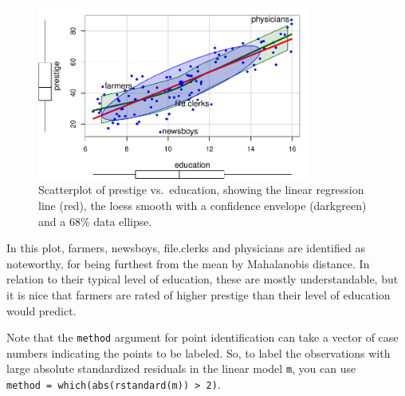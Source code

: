 \documentclass[
  letterpaper,
  10pt,
  krantz2]{krantz}
\begin{document}
\begin{figure}

{\centering \includegraphics[width=0.8\textwidth,height=\textheight]{figs/ch03/fig-Prestige-scatterplot-educ1-1.pdf}

}

\caption{\label{fig-Prestige-scatterplot-educ1}Scatterplot of prestige
vs.~education, showing the linear regression line (red), the loess
smooth with a confidence envelope (darkgreen) and a 68\% data ellipse.}

\end{figure}

In this plot, farmers, newsboys, file.clerks and physicians are
identified as noteworthy, for being furthest from the mean by
Mahalanobis distance. In relation to their typical level of education,
these are mostly understandable, but it is nice that farmers are rated
of higher prestige than their level of education would predict.

Note that the \texttt{method} argument for point identification can take
a vector of case numbers indicating the points to be labeled. So, to
label the observations with large absolute standardized residuals in the
linear model \texttt{m}, you can use
\texttt{method\ =\ which(abs(rstandard(m))\ \textgreater{}\ 2)}.
\end{document}
